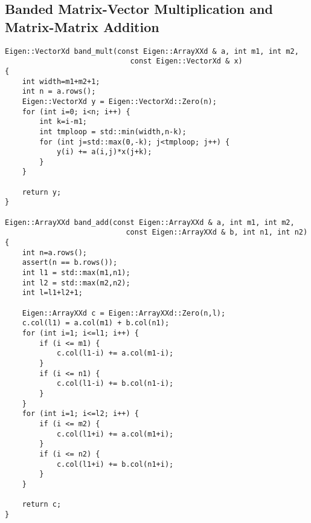 \documentclass[paper=a4, fontsize=11pt]{scrartcl} %
\numberwithin{equation}{section} %
\numberwithin{figure}{section} %
\numberwithin{table}{section} %
\begin{document}
\subsection{Banded Matrix-Vector Multiplication and Matrix-Matrix Addition}
\begin{lstlisting}
Eigen::VectorXd band_mult(const Eigen::ArrayXXd & a, int m1, int m2,
                             const Eigen::VectorXd & x)
{
    int width=m1+m2+1;
    int n = a.rows();
    Eigen::VectorXd y = Eigen::VectorXd::Zero(n);
    for (int i=0; i<n; i++) {
        int k=i-m1;
        int tmploop = std::min(width,n-k);
        for (int j=std::max(0,-k); j<tmploop; j++) {
            y(i) += a(i,j)*x(j+k);
        }
    }

    return y;
}

Eigen::ArrayXXd band_add(const Eigen::ArrayXXd & a, int m1, int m2,
                            const Eigen::ArrayXXd & b, int n1, int n2)
{
    int n=a.rows();
    assert(n == b.rows());
    int l1 = std::max(m1,n1);
    int l2 = std::max(m2,n2);
    int l=l1+l2+1;

    Eigen::ArrayXXd c = Eigen::ArrayXXd::Zero(n,l);
    c.col(l1) = a.col(m1) + b.col(n1);
    for (int i=1; i<=l1; i++) {
        if (i <= m1) {
            c.col(l1-i) += a.col(m1-i);
        }
        if (i <= n1) {
            c.col(l1-i) += b.col(n1-i);
        }
    }
    for (int i=1; i<=l2; i++) {
        if (i <= m2) {
            c.col(l1+i) += a.col(m1+i);
        }
        if (i <= n2) {
            c.col(l1+i) += b.col(n1+i);
        }
    }

    return c;
}
\end{lstlisting}

\newpage
\end{document}
